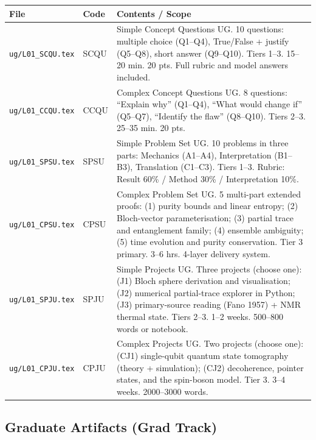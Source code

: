 \documentclass[11pt,a4paper]{article}
\begin{document}
\begin{tabularx}{\textwidth}{llX}
\toprule
\textbf{File} & \textbf{Code} & \textbf{Contents / Scope}\\
\midrule
\texttt{ug/L01\_SCQU.tex}
& SCQU
& Simple Concept Questions UG. 10 questions: multiple choice (Q1--Q4),
  True/False + justify (Q5--Q8), short answer (Q9--Q10).
  Tiers 1--3. 15--20 min. 20 pts. Full rubric and model answers included.\\
\addlinespace
\texttt{ug/L01\_CCQU.tex}
& CCQU
& Complex Concept Questions UG. 8 questions:
  ``Explain why'' (Q1--Q4), ``What would change if'' (Q5--Q7),
  ``Identify the flaw'' (Q8--Q10). Tiers 2--3. 25--35 min. 20 pts.\\
\addlinespace
\texttt{ug/L01\_SPSU.tex}
& SPSU
& Simple Problem Set UG. 10 problems in three parts:
  Mechanics (A1--A4), Interpretation (B1--B3), Translation (C1--C3).
  Tiers 1--3. Rubric: Result 60\% / Method 30\% / Interpretation 10\%.\\
\addlinespace
\texttt{ug/L01\_CPSU.tex}
& CPSU
& Complex Problem Set UG. 5 multi-part extended proofs:
  (1) purity bounds and linear entropy; (2) Bloch-vector parameterisation;
  (3) partial trace and entanglement family; (4) ensemble ambiguity;
  (5) time evolution and purity conservation.
  Tier 3 primary. 3--6 hrs. 4-layer delivery system.\\
\addlinespace
\texttt{ug/L01\_SPJU.tex}
& SPJU
& Simple Projects UG. Three projects (choose one):
  (J1) Bloch sphere derivation and visualisation;
  (J2) numerical partial-trace explorer in Python;
  (J3) primary-source reading (Fano 1957) + NMR thermal state.
  Tiers 2--3. 1--2 weeks. 500--800 words or notebook.\\
\addlinespace
\texttt{ug/L01\_CPJU.tex}
& CPJU
& Complex Projects UG. Two projects (choose one):
  (CJ1) single-qubit quantum state tomography (theory + simulation);
  (CJ2) decoherence, pointer states, and the spin-boson model.
  Tier 3. 3--4 weeks. 2000--3000 words.\\
\bottomrule
\end{tabularx}

\subsection*{Graduate Artifacts (Grad Track)}
\end{document}
